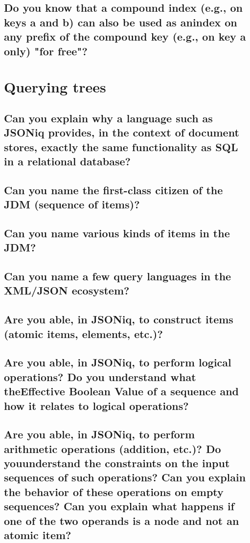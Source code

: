 \documentclass{article}
\begin{document}
\subsection{Do you know that a compound index (e.g., on keys a and b) can also be used as anindex on any prefix of the compound key (e.g., on key a only) "for free"?}

\pagebreak

\section{Querying trees}
\subsection{Can you explain why a language such as JSONiq provides, in the context of document stores, exactly the same functionality as SQL in a relational database?}
\subsection{Can you name the first-class citizen of the JDM (sequence of items)?}
\subsection{Can you name various kinds of items in the JDM?}
\subsection{Can you name a few query languages in the XML/JSON ecosystem?}
\subsection{Are you able, in JSONiq, to construct items (atomic items, elements, etc.)?}
\subsection{Are you able, in JSONiq, to perform logical operations? Do you understand what theEffective Boolean Value of a sequence and how it relates to logical operations?}
\subsection{Are you able, in JSONiq, to perform arithmetic operations (addition, etc.)? Do youunderstand the constraints on the input sequences of such operations? Can you explain the behavior of these operations on empty sequences? Can you explain what happens if one of the two operands is a node and not an atomic item?}
\end{document}
